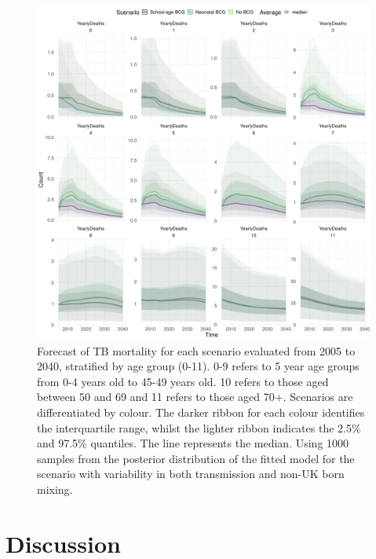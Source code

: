 \documentclass[11pt,twoside]{bristolthesis}
\begin{document}
  \begin{figure}
  
  {\centering \includegraphics[width=0.8\linewidth]{chapters/model-fitting/plots/overview-scenarios-deaths-future-age-1} 
  
  }
  
  \caption[Forecast of TB mortality for each scenario evaluated from 2005 to 2040, stratified by age group, stratified by age group.]{Forecast of TB mortality for each scenario evaluated from 2005 to 2040, stratified by age group (0-11). 0-9 refers to 5 year age groups from 0-4 years old to 45-49 years old. 10 refers to those aged between 50 and 69 and 11 refers to those aged 70+. Scenarios are differentiated by colour. The darker ribbon for each colour identifies the interquartile range, whilst the lighter ribbon indicates the 2.5\% and 97.5\% quantiles. The line represents the median. Using 1000 samples from the posterior distribution of the fitted model for the scenario with variability in both transmission and non-UK born mixing.}\label{fig:10-age-scenarios-deaths-fig}
  \end{figure}
  \newpage
  
  \hypertarget{discussion-7}{%
  \section{Discussion}\label{discussion-7}}
  
\end{document}
